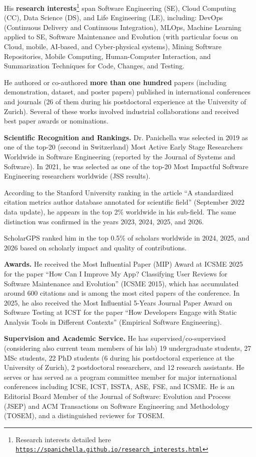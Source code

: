 \documentclass[11pt]{article}
\providecommand*\url[1]{\href{#1}{#1}}
\renewcommand*\url[1]{\href{#1}{\texttt{#1}}}
\begin{document}
His \textbf{research interests}\footnote{Research interests detailed here \url{https://spanichella.github.io/research\_interests.html}} span Software Engineering (SE), Cloud Computing (CC), Data Science (DS), and Life Engineering (LE), including:
DevOps (Continuous Delivery and Continuous Integration), MLOps, Machine Learning applied to SE, Software Maintenance and Evolution (with particular focus on Cloud, mobile, AI-based, and Cyber-physical systems), Mining Software Repositories, Mobile Computing, Human-Computer Interaction, and Summarization Techniques for Code, Changes, and Testing.

He authored or co-authored \textbf{more than one hundred} papers (including demonstration, dataset, and poster papers) published in international conferences and journals (26 of them during his postdoctoral experience at the University of Zurich). Several of these works involved industrial collaborations and received best paper awards or nominations.

\medskip
\noindent
\textbf{Scientific Recognition and Rankings.}
Dr. Panichella was selected in 2019 as one of the top-20 (second in Switzerland) Most Active Early Stage Researchers Worldwide in Software Engineering (reported by the Journal of Systems and Software). In 2021, he was selected as one of the top-20 Most Impactful Software Engineering researchers worldwide (JSS results). 

According to the Stanford University ranking in the article ``A standardized citation metrics author database annotated for scientific field'' (September 2022 data update), he appears in the top 2\% worldwide in his sub-field. The same distinction was confirmed in the years 2023, 2024, 2025, and 2026. 

ScholarGPS ranked him in the top 0.5\% of scholars worldwide in 2024, 2025, and 2026 based on scholarly impact and quality of contributions.

\medskip
\noindent
\textbf{Awards.}
He received the Most Influential Paper (MIP) Award at ICSME 2025 for the paper ``How Can I Improve My App? Classifying User Reviews for Software Maintenance and Evolution'' (ICSME 2015), which has accumulated around 600 citations and is among the most cited papers of the conference. 
In 2025, he also received the Most Influential 5-Years Journal Paper Award on Software Testing at ICST for the paper ``How Developers Engage with Static Analysis Tools in Different Contexts'' (Empirical Software Engineering).

\medskip
\noindent
\textbf{Supervision and Academic Service.}
He has supervised/co-supervised (considering also current team members of his lab)  19 undergraduate students, 27 MSc students, 22 PhD students (6 during his postdoctoral experience at the University of Zurich), 2 postdoctoral researchers, and 12 research assistants. 
He serves or has served as a program committee member for major international conferences including ICSE, ICST, ISSTA, ASE, FSE, and ICSME. 
He is an Editorial Board Member of the Journal of Software: Evolution and Process (JSEP) and ACM Transactions on Software Engineering and Methodology (TOSEM), and a distinguished reviewer for TOSEM.
\end{document}
